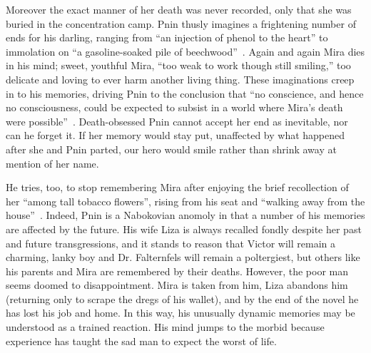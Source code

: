 Moreover the exact manner of her death was never recorded, only that she was buried in the concentration camp.
Pnin thusly imagines a frightening number of ends for his darling, ranging from ``an injection of phenol to the heart'' to immolation on ``a gasoline-soaked pile of beechwood''~\cite[100]{pnin}.
Again and again Mira dies in his mind; sweet, youthful Mira, ``too weak to work though still smiling,'' too delicate and loving to ever harm another living thing. 
These imaginations creep in to his memories, driving Pnin to the conclusion that ``no conscience, and hence no consciousness, could be expected to subsist in a world where Mira's death were possible''~\cite[100]{pnin}. 
Death-obsessed Pnin cannot accept her end as inevitable, nor can he forget it.
If her memory would stay put, unaffected by what happened after she and Pnin parted, our hero would smile rather than shrink away at mention of her name.

He tries, too, to stop remembering Mira after enjoying the brief recollection of her ``among tall tobacco flowers'', rising from his seat and ``walking away from the house''~\cite[99]{pnin}.
Indeed, Pnin is a Nabokovian anomoly in that a number of his memories are affected by the future.
His wife Liza is always recalled fondly despite her past and future transgressions, and it stands to reason that Victor will remain a charming, lanky boy and Dr. Falternfels will remain a poltergiest, but others like his parents and Mira are remembered by their deaths.
However, the poor man seems doomed to disappointment. 
Mira is taken from him, Liza abandons him (returning only to scrape the dregs of his wallet), and by the end of the novel he has lost his job and home.
In this way, his unusually dynamic memories may be understood as a trained reaction.
His mind jumps to the morbid because experience has taught the sad man to expect the worst of life.
